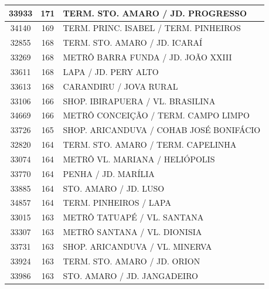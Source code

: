 \documentclass[
	12pt,				%
	oneside,			%
	a4paper,			%
	english,			%
	brazil				%
	]{abntex2ppgsi}
\begin{document}
\begin{apendicesenv}
\begin{longtable}{c|c|p{7cm}}
    33933 & 171   & TERM. STO. AMARO / JD. PROGRESSO \\
\hline

    34140 & 169   & TERM. PRINC. ISABEL / TERM. PINHEIROS \\
\hline

    32855 & 168   & TERM. STO. AMARO / JD. ICARAÍ \\
\hline

    33269 & 168   & METRÔ BARRA FUNDA / JD. JOÃO XXIII \\
\hline

    33611 & 168   & LAPA / JD. PERY ALTO \\
\hline

    33613 & 168   & CARANDIRU / JOVA RURAL \\
\hline

    33106 & 166   & SHOP. IBIRAPUERA / VL. BRASILINA \\
\hline

    34669 & 166   & METRÔ CONCEIÇÃO / TERM. CAMPO LIMPO \\
\hline

    33726 & 165   & SHOP. ARICANDUVA / COHAB JOSÉ BONIFÁCIO  \\
\hline

    32820 & 164   & TERM. STO. AMARO / TERM. CAPELINHA \\
\hline

    33074 & 164   & METRÔ VL. MARIANA / HELIÓPOLIS \\
\hline

    33770 & 164   & PENHA / JD. MARÍLIA \\
\hline

    33885 & 164   & STO. AMARO / JD. LUSO \\
\hline

    34857 & 164   & TERM. PINHEIROS / LAPA \\
\hline

    33015 & 163   & METRÔ TATUAPÉ / VL. SANTANA \\
\hline

    33307 & 163   & METRÔ SANTANA / VL. DIONISIA \\
\hline

    33731 & 163   & SHOP. ARICANDUVA / VL. MINERVA \\
\hline

    33924 & 163   & TERM. STO. AMARO / JD. ORION \\
\hline

    33986 & 163   & STO. AMARO / JD. JANGADEIRO \\
\hline


\end{longtable}
\end{apendicesenv}
\end{document}
